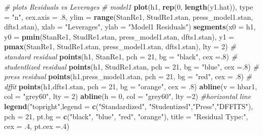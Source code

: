 \documentclass[]{article}
\newenvironment{Shaded}{\begin{snugshade}}{\end{snugshade}}
\newcommand{\KeywordTok}[1]{\textcolor[rgb]{0.13,0.29,0.53}{\textbf{#1}}}
\newcommand{\DataTypeTok}[1]{\textcolor[rgb]{0.13,0.29,0.53}{#1}}
\newcommand{\DecValTok}[1]{\textcolor[rgb]{0.00,0.00,0.81}{#1}}
\newcommand{\StringTok}[1]{\textcolor[rgb]{0.31,0.60,0.02}{#1}}
\newcommand{\CommentTok}[1]{\textcolor[rgb]{0.56,0.35,0.01}{\textit{#1}}}
\newcommand{\NormalTok}[1]{#1}
\begin{document}
\begin{Shaded}
\begin{Highlighting}[]
\CommentTok{# plots Residuals vs Leverages}
\CommentTok{# model1}
\KeywordTok{plot}\NormalTok{(h1, }\KeywordTok{rep}\NormalTok{(}\DecValTok{0}\NormalTok{, }\KeywordTok{length}\NormalTok{(y1.hat)), }\DataTypeTok{type =} \StringTok{"n"}\NormalTok{, }\DataTypeTok{cex.axis =}\NormalTok{ .}\DecValTok{8}\NormalTok{,}
     \DataTypeTok{ylim =} \KeywordTok{range}\NormalTok{(StanRe1, StudRe1.stan, press_model1.stan, dfts1.stan),}
     \DataTypeTok{xlab =} \StringTok{"Leverages"}\NormalTok{, }\DataTypeTok{ylab =} \StringTok{"Model1 Residuals"}\NormalTok{)}
\KeywordTok{segments}\NormalTok{(}\DataTypeTok{x0 =}\NormalTok{ h1,}
         \DataTypeTok{y0 =} \KeywordTok{pmin}\NormalTok{(StanRe1, StudRe1.stan, press_model1.stan, dfts1.stan), }
         \DataTypeTok{y1 =} \KeywordTok{pmax}\NormalTok{(StanRe1, StudRe1.stan, press_model1.stan, dfts1.stan), }
         \DataTypeTok{lty =} \DecValTok{2}\NormalTok{)}
\CommentTok{# standard residual}
\KeywordTok{points}\NormalTok{(h1, StanRe1, }\DataTypeTok{pch =} \DecValTok{21}\NormalTok{, }\DataTypeTok{bg =} \StringTok{"black"}\NormalTok{, }\DataTypeTok{cex =}\NormalTok{.}\DecValTok{8}\NormalTok{) }
\CommentTok{# studentlized residual}
\KeywordTok{points}\NormalTok{(h1, StudRe1.stan, }\DataTypeTok{pch =} \DecValTok{21}\NormalTok{, }\DataTypeTok{bg =} \StringTok{"blue"}\NormalTok{, }\DataTypeTok{cex =}\NormalTok{.}\DecValTok{8}\NormalTok{) }
\CommentTok{# press residual}
\KeywordTok{points}\NormalTok{(h1,press_model1.stan, }\DataTypeTok{pch =} \DecValTok{21}\NormalTok{, }\DataTypeTok{bg =} \StringTok{"red"}\NormalTok{, }\DataTypeTok{cex =}\NormalTok{ .}\DecValTok{8}\NormalTok{)}
\CommentTok{# dffit}
\KeywordTok{points}\NormalTok{(h1,dfts1.stan, }\DataTypeTok{pch =} \DecValTok{21}\NormalTok{, }\DataTypeTok{bg =} \StringTok{"orange"}\NormalTok{, }\DataTypeTok{cex =}\NormalTok{ .}\DecValTok{8}\NormalTok{) }
\KeywordTok{abline}\NormalTok{(}\DataTypeTok{v =}\NormalTok{ hbar1, }\DataTypeTok{col =} \StringTok{"grey60"}\NormalTok{, }\DataTypeTok{lty =} \DecValTok{2}\NormalTok{)}
\KeywordTok{abline}\NormalTok{(}\DataTypeTok{h =} \DecValTok{0}\NormalTok{, }\DataTypeTok{col =} \StringTok{"grey60"}\NormalTok{, }\DataTypeTok{lty =}\DecValTok{2}\NormalTok{) }\CommentTok{#horizontal line}
\KeywordTok{legend}\NormalTok{(}\StringTok{"topright"}\NormalTok{,}\DataTypeTok{legend =} \KeywordTok{c}\NormalTok{(}\StringTok{"Standardized"}\NormalTok{, }\StringTok{"Studentized"}\NormalTok{,}\StringTok{"Press"}\NormalTok{,}\StringTok{"DFFITS"}\NormalTok{), }
       \DataTypeTok{pch =} \DecValTok{21}\NormalTok{,}
       \DataTypeTok{pt.bg =} \KeywordTok{c}\NormalTok{(}\StringTok{"black"}\NormalTok{, }\StringTok{"blue"}\NormalTok{, }\StringTok{"red"}\NormalTok{, }\StringTok{"orange"}\NormalTok{),}
       \DataTypeTok{title =} \StringTok{"Residual Type:"}\NormalTok{, }\DataTypeTok{cex =}\NormalTok{ .}\DecValTok{4}\NormalTok{, }\DataTypeTok{pt.cex =}\NormalTok{.}\DecValTok{4}\NormalTok{)}


\end{Highlighting}
\end{Shaded}
\end{document}
